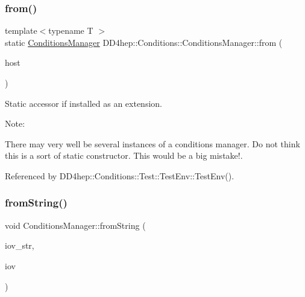 \hypertarget{class_d_d4hep_1_1_conditions_1_1_conditions_manager_a4b4e31b3c09663517d5274a2506be92a}{}\label{class_d_d4hep_1_1_conditions_1_1_conditions_manager_a4b4e31b3c09663517d5274a2506be92a} 
\subsubsection{\texorpdfstring{from()}{from()}\hspace{0.1cm}{\footnotesize\ttfamily [2/2]}}
{\footnotesize\ttfamily template$<$typename T $>$ \\
static \hyperlink{class_d_d4hep_1_1_conditions_1_1_conditions_manager}{Conditions\+Manager} D\+D4hep\+::\+Conditions\+::\+Conditions\+Manager\+::from (\begin{DoxyParamCaption}\item[{\hyperlink{class_t}{T} \&}]{host }\end{DoxyParamCaption})\hspace{0.3cm}{\ttfamily [static]}}



Static accessor if installed as an extension. 

Note\+:

There may very well be several instances of a conditions manager. Do not think this is a sort of \textquotesingle{}static constructor\textquotesingle{}. This would be a big mistake!. 

Referenced by D\+D4hep\+::\+Conditions\+::\+Test\+::\+Test\+Env\+::\+Test\+Env().

\hypertarget{class_d_d4hep_1_1_conditions_1_1_conditions_manager_a8dc77ac3a674c26ccb78a5d23c8f6a07}{}\label{class_d_d4hep_1_1_conditions_1_1_conditions_manager_a8dc77ac3a674c26ccb78a5d23c8f6a07} 
\subsubsection{\texorpdfstring{from\+String()}{fromString()}}
{\footnotesize\ttfamily void Conditions\+Manager\+::from\+String (\begin{DoxyParamCaption}\item[{const std\+::string \&}]{iov\+\_\+str,  }\item[{\hyperlink{class_d_d4hep_1_1_i_o_v}{I\+OV} \&}]{iov }\end{DoxyParamCaption})}



